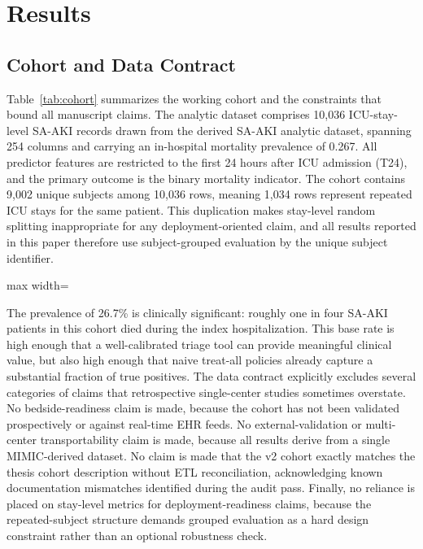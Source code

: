 \section{Results}

\subsection{Cohort and Data Contract}

Table~\ref{tab:cohort} summarizes the working cohort and the constraints that bound all manuscript claims. The analytic dataset comprises 10{,}036 ICU-stay-level SA-AKI records drawn from the derived SA-AKI analytic dataset, spanning 254 columns and carrying an in-hospital mortality prevalence of 0.267. All predictor features are restricted to the first 24 hours after ICU admission (T24), and the primary outcome is the binary mortality indicator. The cohort contains 9{,}002 unique subjects among 10{,}036 rows, meaning 1{,}034 rows represent repeated ICU stays for the same patient. This duplication makes stay-level random splitting inappropriate for any deployment-oriented claim, and all results reported in this paper therefore use subject-grouped evaluation by the unique subject identifier.

\begin{table}[!t]
\centering
\small
\caption{Cohort and data-contract summary.}
\label{tab:cohort}
\begin{adjustbox}{max width=\linewidth}

\end{adjustbox}
\end{table}

The prevalence of 26.7\% is clinically significant: roughly one in four SA-AKI patients in this cohort died during the index hospitalization. This base rate is high enough that a well-calibrated triage tool can provide meaningful clinical value, but also high enough that naive treat-all policies already capture a substantial fraction of true positives. The data contract explicitly excludes several categories of claims that retrospective single-center studies sometimes overstate. No bedside-readiness claim is made, because the cohort has not been validated prospectively or against real-time EHR feeds. No external-validation or multi-center transportability claim is made, because all results derive from a single MIMIC-derived dataset. No claim is made that the v2 cohort exactly matches the thesis cohort description without ETL reconciliation, acknowledging known documentation mismatches identified during the audit pass. Finally, no reliance is placed on stay-level metrics for deployment-readiness claims, because the repeated-subject structure demands grouped evaluation as a hard design constraint rather than an optional robustness check.

